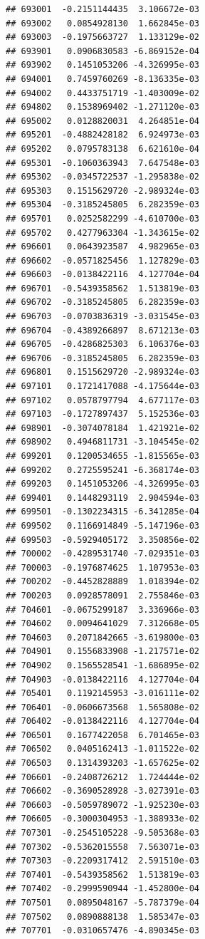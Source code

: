 \begin{frame}[fragile]
\begin{verbatim}
## 693001  -0.2151144435  3.106672e-03
## 693002   0.0854928130  1.662845e-03
## 693003  -0.1975663727  1.133129e-02
## 693901   0.0906830583 -6.869152e-04
## 693902   0.1451053206 -4.326995e-03
## 694001   0.7459760269 -8.136335e-03
## 694002   0.4433751719 -1.403009e-02
## 694802   0.1538969402 -1.271120e-03
## 695002   0.0128820031  4.264851e-04
## 695201  -0.4882428182  6.924973e-03
## 695202   0.0795783138  6.621610e-04
## 695301  -0.1060363943  7.647548e-03
## 695302  -0.0345722537 -1.295838e-02
## 695303   0.1515629720 -2.989324e-03
## 695304  -0.3185245805  6.282359e-03
## 695701   0.0252582299 -4.610700e-03
## 695702   0.4277963304 -1.343615e-02
## 696601   0.0643923587  4.982965e-03
## 696602  -0.0571825456  1.127829e-03
## 696603  -0.0138422116  4.127704e-04
## 696701  -0.5439358562  1.513819e-03
## 696702  -0.3185245805  6.282359e-03
## 696703  -0.0703836319 -3.031545e-03
## 696704  -0.4389266897  8.671213e-03
## 696705  -0.4286825303  6.106376e-03
## 696706  -0.3185245805  6.282359e-03
## 696801   0.1515629720 -2.989324e-03
## 697101   0.1721417088 -4.175644e-03
## 697102   0.0578797794  4.677117e-03
## 697103  -0.1727897437  5.152536e-03
## 698901  -0.3074078184  1.421921e-02
## 698902   0.4946811731 -3.104545e-02
## 699201   0.1200534655 -1.815565e-03
## 699202   0.2725595241 -6.368174e-03
## 699203   0.1451053206 -4.326995e-03
## 699401   0.1448293119  2.904594e-03
## 699501  -0.1302234315 -6.341285e-04
## 699502   0.1166914849 -5.147196e-03
## 699503  -0.5929405172  3.350856e-02
## 700002  -0.4289531740 -7.029351e-03
## 700003  -0.1976874625  1.107953e-03
## 700202  -0.4452828889  1.018394e-02
## 700203   0.0928578091  2.755846e-03
## 704601  -0.0675299187  3.336966e-03
## 704602   0.0094641029  7.312668e-05
## 704603   0.2071842665 -3.619800e-03
## 704901   0.1556833908 -1.217571e-02
## 704902   0.1565528541 -1.686895e-02
## 704903  -0.0138422116  4.127704e-04
## 705401   0.1192145953 -3.016111e-02
## 706401  -0.0606673568  1.565808e-02
## 706402  -0.0138422116  4.127704e-04
## 706501   0.1677422058  6.701465e-03
## 706502   0.0405162413 -1.011522e-02
## 706503   0.1314393203 -1.657625e-02
## 706601  -0.2408726212  1.724444e-02
## 706602  -0.3690528928 -3.027391e-03
## 706603  -0.5059789072 -1.925230e-03
## 706605  -0.3000304953 -1.388933e-02
## 707301  -0.2545105228 -9.505368e-03
## 707302  -0.5362015558  7.563071e-03
## 707303  -0.2209317412  2.591510e-03
## 707401  -0.5439358562  1.513819e-03
## 707402  -0.2999590944 -1.452800e-04
## 707501   0.0895048167 -5.787379e-04
## 707502   0.0890888138  1.585347e-03
## 707701  -0.0310657476 -4.890345e-03

\end{verbatim}
\end{frame}
